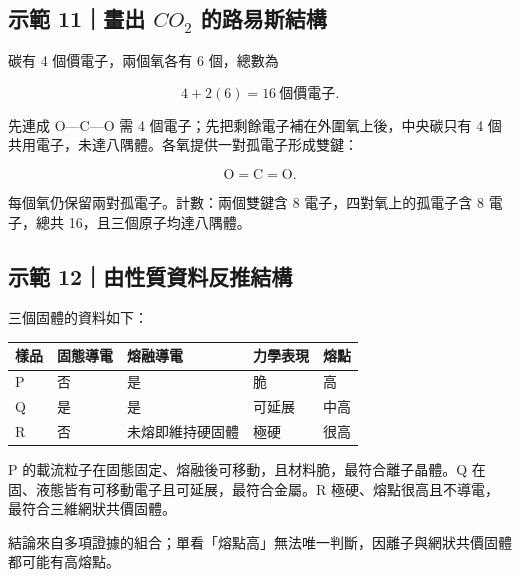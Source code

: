\documentclass[11pt,a4paper]{article}
\newcounter{none}
\begin{document}
\begin{HandoutWorkedExample}

\subsection{\texorpdfstring{示範 11｜畫出 \(CO_2\) 的路易斯結構}{示範 11｜畫出 CO\_2 的路易斯結構}}\label{ux793aux7bc4-11ux756bux51fa-co_2-ux7684ux8defux6613ux65afux7d50ux69cb}

碳有 4 個價電子，兩個氧各有 6 個，總數為

\[
4+2(6)=16\ \text{個價電子}.
\]

先連成 O---C---O 需 4 個電子；先把剩餘電子補在外圍氧上後，中央碳只有 4 個共用電子，未達八隅體。各氧提供一對孤電子形成雙鍵：

\[
\boxed{\mathrm{O=C=O}}.
\]

每個氧仍保留兩對孤電子。計數：兩個雙鍵含 8 電子，四對氧上的孤電子含 8 電子，總共 16，且三個原子均達八隅體。

\end{HandoutWorkedExample}

\begin{HandoutWorkedExample}

\subsection{示範 12｜由性質資料反推結構}\label{ux793aux7bc4-12ux7531ux6027ux8ceaux8cc7ux6599ux53cdux63a8ux7d50ux69cb}

三個固體的資料如下：

{\def\LTcaptype{none} %
\begin{longtable}[]{@{}lllll@{}}
\toprule\noalign{}
樣品 & 固態導電 & 熔融導電 & 力學表現 & 熔點 \\
\midrule\noalign{}
\endhead
\bottomrule\noalign{}
\endlastfoot
P & 否 & 是 & 脆 & 高 \\
Q & 是 & 是 & 可延展 & 中高 \\
R & 否 & 未熔即維持硬固體 & 極硬 & 很高 \\
\end{longtable}
}

P 的載流粒子在固態固定、熔融後可移動，且材料脆，最符合離子晶體。Q 在固、液態皆有可移動電子且可延展，最符合金屬。R 極硬、熔點很高且不導電，最符合三維網狀共價固體。

結論來自多項證據的組合；單看「熔點高」無法唯一判斷，因離子與網狀共價固體都可能有高熔點。

\end{HandoutWorkedExample}
\end{document}
